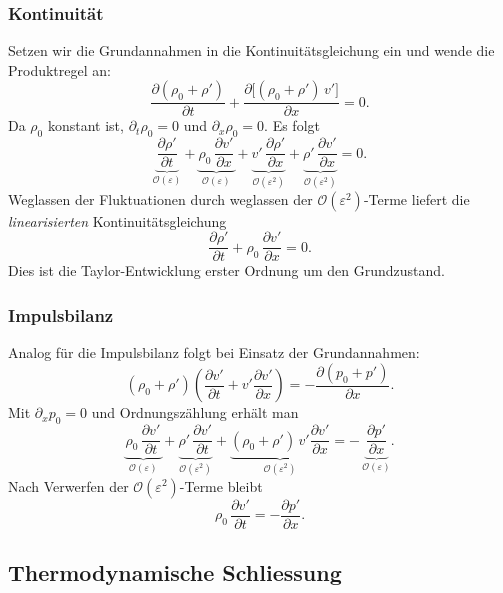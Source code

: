 \subsubsection*{Kontinuität}
Setzen wir die Grundannahmen in die Kontinuitätsgleichung ein und
wende die Produktregel an:
\[
    \frac{\partial(\rho_0+\rho')}{\partial t}
    +\frac{\partial\big[(\rho_0+\rho')\,v'\big]}{\partial x}=0.
\]
Da \(\rho_0\) konstant ist, \(\partial_t\rho_0=0\) und \(\partial_x\rho_0=0\).
Es folgt
\[
    \underbrace{\frac{\partial \rho'}{\partial t}}_{\mathcal{O}(\varepsilon)}
    +\underbrace{\rho_0\,\frac{\partial v'}{\partial x}}_{\mathcal{O}(\varepsilon)}
    +\underbrace{v'\,\frac{\partial \rho'}{\partial x}}_{\mathcal{O}(\varepsilon^2)}
    +\underbrace{\rho'\,\frac{\partial v'}{\partial x}}_{\mathcal{O}(\varepsilon^2)}=0.
\]
Weglassen der Fluktuationen durch weglassen der \(\mathcal{O}(\varepsilon^2)\)-Terme
liefert die \emph{linearisierten} Kontinuitätsgleichung
\begin{equation}
    \frac{\partial \rho'}{\partial t}+\rho_0\,\frac{\partial v'}{\partial x}=0.
    \label{eq:lin-cont}
\end{equation}
Dies ist die Taylor-Entwicklung erster Ordnung um den Grundzustand.

\subsubsection*{Impulsbilanz}
Analog für die Impulsbilanz folgt bei Einsatz der Grundannahmen:
\[
    (\rho_0+\rho')\!\left(\frac{\partial v'}{\partial t}+v'\frac{\partial v'}{\partial x}\right)
    =-\frac{\partial (p_0+p')}{\partial x}.
\]
Mit \(\partial_x p_0=0\) und Ordnungszählung erhält man
\[
    \underbrace{\rho_0\,\frac{\partial v'}{\partial t}}_{\mathcal{O}(\varepsilon)}
    +\underbrace{\rho'\,\frac{\partial v'}{\partial t}}_{\mathcal{O}(\varepsilon^2)}
    +\underbrace{(\rho_0+\rho')\,v'\frac{\partial v'}{\partial x}}_{\mathcal{O}(\varepsilon^2)}
    =-\,\underbrace{\frac{\partial p'}{\partial x}}_{\mathcal{O}(\varepsilon)}.
\]
Nach Verwerfen der \(\mathcal{O}(\varepsilon^2)\)-Terme bleibt
\begin{equation}
    \rho_0\,\frac{\partial v'}{\partial t}=-\frac{\partial p'}{\partial x}.
    \label{eq:lin-mom}
\end{equation}

\subsection{Thermodynamische Schliessung}

